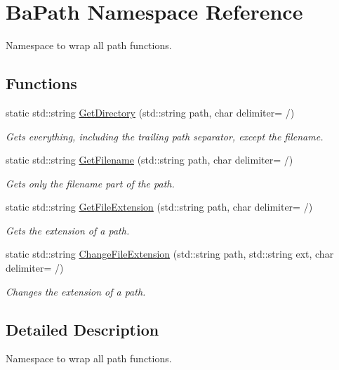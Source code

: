 \hypertarget{namespaceBaPath}{}\section{Ba\+Path Namespace Reference}
\label{namespaceBaPath}


Namespace to wrap all path functions.  


\subsection*{Functions}
\begin{DoxyCompactItemize}
\item 
static std\+::string \hyperlink{namespaceBaPath_aee6b101395e5f32a76b304aa765de13c}{Get\+Directory} (std\+::string path, char delimiter= \textquotesingle{}/\textquotesingle{})
\begin{DoxyCompactList}\small\item\em Gets everything, including the trailing path separator, except the filename. \end{DoxyCompactList}\item 
static std\+::string \hyperlink{namespaceBaPath_a41d87786f4a43d64094624187ac90dca}{Get\+Filename} (std\+::string path, char delimiter= \textquotesingle{}/\textquotesingle{})
\begin{DoxyCompactList}\small\item\em Gets only the filename part of the path. \end{DoxyCompactList}\item 
static std\+::string \hyperlink{namespaceBaPath_a42b3acac9c048e45a531c9dc4be319f1}{Get\+File\+Extension} (std\+::string path, char delimiter= \textquotesingle{}/\textquotesingle{})
\begin{DoxyCompactList}\small\item\em Gets the extension of a path. \end{DoxyCompactList}\item 
static std\+::string \hyperlink{namespaceBaPath_a70f965f0c97d211e1f91dc2f16e05195}{Change\+File\+Extension} (std\+::string path, std\+::string ext, char delimiter= \textquotesingle{}/\textquotesingle{})
\begin{DoxyCompactList}\small\item\em Changes the extension of a path. \end{DoxyCompactList}\end{DoxyCompactItemize}


\subsection{Detailed Description}
Namespace to wrap all path functions. 

